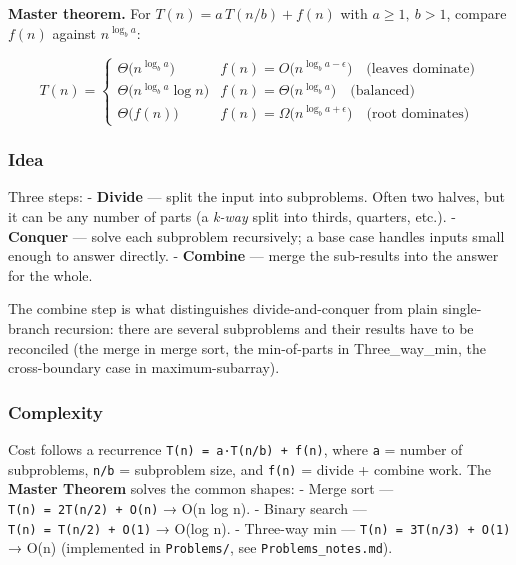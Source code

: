 \documentclass[
  10pt,
  letterpaper,
  onecolumn]{article}
\begin{document}
\textbf{Master theorem.} For \(T(n)=a\,T(n/b)+f(n)\) with
\(a\ge1,\ b>1\), compare \(f(n)\) against \(n^{\log_b a}\):

\begin{equation*}
T(n)=
\begin{cases}
\Theta\bigl(n^{\log_b a}\bigr) & f(n)=O\bigl(n^{\log_b a-\epsilon}\bigr)\quad\text{(leaves dominate)}\\[2pt]
\Theta\bigl(n^{\log_b a}\log n\bigr) & f(n)=\Theta\bigl(n^{\log_b a}\bigr)\quad\text{(balanced)}\\[2pt]
\Theta\bigl(f(n)\bigr) & f(n)=\Omega\bigl(n^{\log_b a+\epsilon}\bigr)\quad\text{(root dominates)}
\end{cases}
\end{equation*}

\hypertarget{idea-3}{%
\subsubsection{Idea}\label{idea-3}}

Three steps: - \textbf{Divide} --- split the input into subproblems.
Often two halves, but it can be any number of parts (a \emph{k-way}
split into thirds, quarters, etc.). - \textbf{Conquer} --- solve each
subproblem recursively; a base case handles inputs small enough to
answer directly. - \textbf{Combine} --- merge the sub-results into the
answer for the whole.

The combine step is what distinguishes divide-and-conquer from plain
single-branch recursion: there are several subproblems and their results
have to be reconciled (the merge in merge sort, the min-of-parts in
Three\_way\_min, the cross-boundary case in maximum-subarray).

\hypertarget{complexity-3}{%
\subsubsection{Complexity}\label{complexity-3}}

Cost follows a recurrence \texttt{T(n)\ =\ a·T(n/b)\ +\ f(n)}, where
\texttt{a} = number of subproblems, \texttt{n/b} = subproblem size, and
\texttt{f(n)} = divide + combine work. The \textbf{Master Theorem}
solves the common shapes: - Merge sort ---
\texttt{T(n)\ =\ 2T(n/2)\ +\ O(n)} → O(n log n). - Binary search ---
\texttt{T(n)\ =\ T(n/2)\ +\ O(1)} → O(log n). - Three-way min ---
\texttt{T(n)\ =\ 3T(n/3)\ +\ O(1)} → O(n) (implemented in
\texttt{Problems/}, see \texttt{Problems\_notes.md}).
\end{document}
